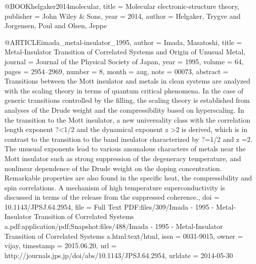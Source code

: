 @BOOK{helgaker2014molecular,
  title = {Molecular electronic-structure theory},
  publisher = {John Wiley \& Sons},
  year = {2014},
  author = {Helgaker, Trygve and Jorgensen, Poul and Olsen, Jeppe}
}

@ARTICLE{imada_metal-insulator_1995,
  author = {Imada, Masatoshi},
  title = {Metal-{Insulator} {Transition} of {Correlated} {Systems} and {Origin}
	of {Unusual} {Metal}},
  journal = {Journal of the Physical Society of Japan},
  year = {1995},
  volume = {64},
  pages = {2954--2969},
  number = {8},
  month = aug,
  note = {00073},
  abstract = {Transitions between the Mott insulator and metals in clean systems
	are analyzed with the scaling theory in terms of quantum critical
	phenomena. In the case of generic transitions controlled by the filling,
	the scaling theory is established from analyses of the Drude weight
	and the compressibility based on hyperscaling. In the transition
	to the Mott insulator, a new universality class with the correlation
	length exponent ?{\textless}1/2 and the dynamical exponent z {\textgreater}2
	is derived, which is in contrast to the transition to the band insulator
	characterized by ?=1/2 and z =2. The unusual exponents lead to various
	anomalous characters of metals near the Mott insulator such as strong
	suppression of the degeneracy temperature, and nonlinear dependence
	of the Drude weight on the doping concentration. Remarkable properties
	are also found in the specific heat, the compressibility and spin
	correlations. A mechanism of high temperature superconductivity is
	discussed in terms of the release from the suppressed coherence.},
  doi = {10.1143/JPSJ.64.2954},
  file = {Full Text PDF:files/309/Imada - 1995 - Metal-Insulator Transition of Correlated Systems a.pdf:application/pdf;Snapshot:files/488/Imada - 1995 - Metal-Insulator Transition of Correlated Systems a.html:text/html},
  issn = {0031-9015},
  owner = {vijay},
  timestamp = {2015.06.20},
  url = {http://journals.jps.jp/doi/abs/10.1143/JPSJ.64.2954},
  urldate = {2014-05-30}
}

